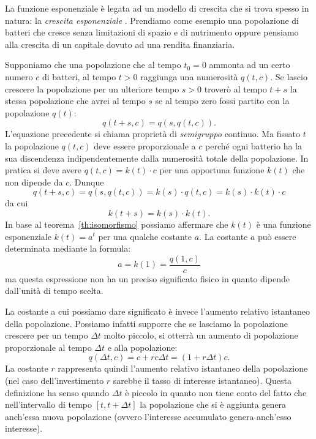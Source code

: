La funzione esponenziale è legata ad un modello di crescita che si trova spesso
in natura: la \emph{crescita esponenziale}%
%
.
Prendiamo come esempio una popolazione di batteri che cresce senza
limitazioni di spazio e di nutrimento oppure
pensiamo alla crescita di un capitale dovuto ad una rendita finanziaria.

Supponiamo che una popolazione che al tempo $t_0=0$
ammonta ad un certo numero $c$ di batteri, al tempo
$t>0$ raggiunga una numerosità $q(t,c)$.
Se lascio crescere la popolazione per un ulteriore
tempo $s>0$ troverò al tempo $t+s$ la stessa
popolazione che avrei al tempo $s$ se al tempo
zero fossi partito con la popolazione $q(t)$:
\[
  q(t+s,c) = q(s,q(t,c)).
\]
L'equazione precedente si chiama proprietà
di \emph{semigruppo}
%
continuo.
Ma fissato $t$ la popolazione $q(t,c)$ deve
essere proporzionale a $c$ perché ogni batterio
ha la sua discendenza indipendentemente dalla numerosità
totale della popolazione. In pratica
si deve avere $q(t,c) = k(t) \cdot c$ per una opportuna
funzione $k(t)$ che non dipende da $c$.
Dunque
\[
  q(t+s,c)
  = q(s,q(t,c))
  = k(s) \cdot q(t,c)
  = k(s) \cdot k(t) \cdot c
\]
da cui
\[
  k(t+s) = k(s) \cdot k(t).
\]
In base al teorema~\ref{th:isomorfismo}
possiamo affermare
che $k(t)$ è una funzione esponenziale $k(t)=a^t$
per una qualche costante $a$.
La costante $a$ può essere determinata mediante la formula:
\[
  a = k(1) = \frac{q(1,c)}{c}
\]
ma questa espressione non ha un preciso significato fisico in quanto
dipende dall'unità di tempo scelta.

La costante a cui possiamo dare significato è invece l'aumento relativo
istantaneo della popolazione. Possiamo infatti supporre che
se lasciamo la popolazione crescere per un tempo $\Delta t$ molto piccolo,
si otterrà un aumento di popolazione proporzionale al tempo $\Delta t$
e alla popolazione:%
\begin{equation}\label{eq:488464}
  q(\Delta t,c) = c + r c \Delta t = (1+r \Delta t) c.
\end{equation}
La costante $r$ rappresenta quindi l'aumento
relativo istantaneo della popolazione (nel caso dell'investimento
$r$ sarebbe il tasso di interesse istantaneo).
Questa definizione ha senso
quando $\Delta t$ è piccolo in quanto non tiene conto del fatto che
nell'intervallo di tempo $[t,t+\Delta t]$ la popolazione che si
è aggiunta genera anch'essa nuova popolazione (ovvero l'interesse
accumulato genera anch'esso interesse).

